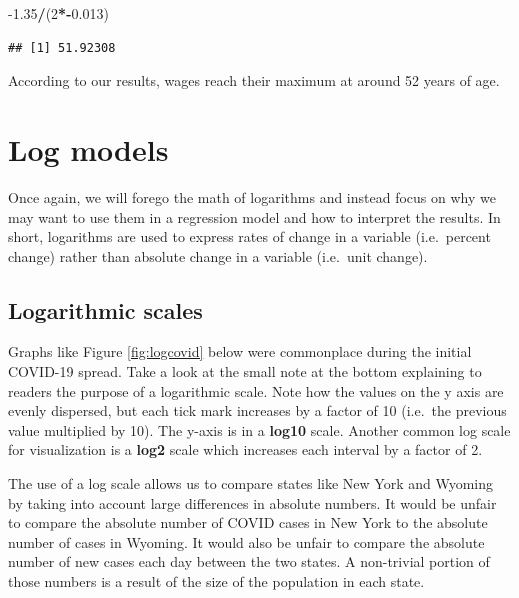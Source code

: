 \documentclass[
]{book}
\newenvironment{Shaded}{\begin{snugshade}}{\end{snugshade}}
\newcommand{\DecValTok}[1]{\textcolor[rgb]{0.00,0.00,0.81}{#1}}
\newcommand{\FloatTok}[1]{\textcolor[rgb]{0.00,0.00,0.81}{#1}}
\newcommand{\NormalTok}[1]{#1}
\newcommand{\OperatorTok}[1]{\textcolor[rgb]{0.81,0.36,0.00}{\textbf{#1}}}
\begin{document}
\begin{Shaded}
\begin{Highlighting}[]
\FloatTok{-1.35}\OperatorTok{/}\NormalTok{(}\DecValTok{2}\OperatorTok{*-}\FloatTok{0.013}\NormalTok{)}
\end{Highlighting}
\end{Shaded}

\begin{verbatim}
## [1] 51.92308
\end{verbatim}

According to our results, wages reach their maximum at around 52 years of age.

\hypertarget{log-models}{%
\section{Log models}\label{log-models}}

Once again, we will forego the math of logarithms and instead focus on why we may want to use them in a regression model and how to interpret the results. In short, logarithms are used to express rates of change in a variable (i.e.~percent change) rather than absolute change in a variable (i.e.~unit change).

\hypertarget{logarithmic-scales}{%
\subsection{Logarithmic scales}\label{logarithmic-scales}}

Graphs like Figure \ref{fig:logcovid} below were commonplace during the initial COVID-19 spread. Take a look at the small note at the bottom explaining to readers the purpose of a logarithmic scale. Note how the values on the y axis are evenly dispersed, but each tick mark increases by a factor of 10 (i.e.~the previous value multiplied by 10). The y-axis is in a \textbf{log10} scale. Another common log scale for visualization is a \textbf{log2} scale which increases each interval by a factor of 2.

The use of a log scale allows us to compare states like New York and Wyoming by taking into account large differences in absolute numbers. It would be unfair to compare the absolute number of COVID cases in New York to the absolute number of cases in Wyoming. It would also be unfair to compare the absolute number of new cases each day between the two states. A non-trivial portion of those numbers is a result of the size of the population in each state.
\end{document}
